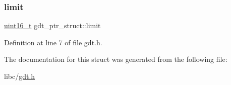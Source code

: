 \mbox{\label{a00138_abf557ff0ca1cf3e130e8ab0086ab4ce6_abf557ff0ca1cf3e130e8ab0086ab4ce6}} 
\subsubsection{\texorpdfstring{limit}{limit}}
{\footnotesize\ttfamily \hyperlink{a00092_a273cf69d639a59973b6019625df33e30_a273cf69d639a59973b6019625df33e30}{uint16\+\_\+t} gdt\+\_\+ptr\+\_\+struct\+::limit}



Definition at line 7 of file gdt.\+h.



The documentation for this struct was generated from the following file\+:\begin{DoxyCompactItemize}
\item 
libc/\hyperlink{a00059}{gdt.\+h}\end{DoxyCompactItemize}
